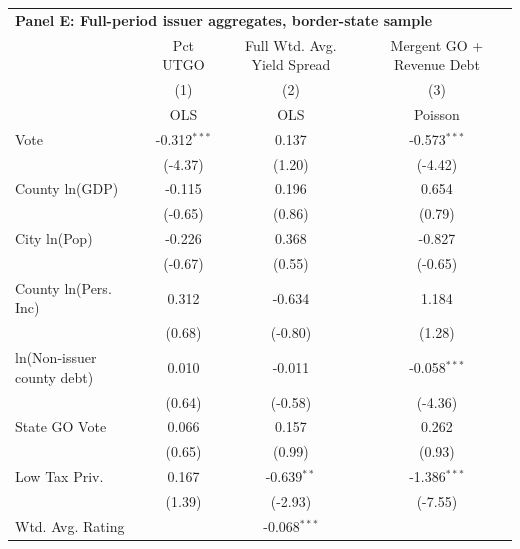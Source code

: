 \begingroup
\centering
\begin{tabular*}{\textwidth}{@{\extracolsep{\fill}}lccc}
\multicolumn{4}{l}{\textbf{Panel E: Full-period issuer aggregates, border-state sample}}\\

\addlinespace
   \toprule
                              & Pct UTGO       & Full Wtd. Avg. Yield Spread & Mergent GO + Revenue Debt\\  
                              & (1)            & (2)                         & (3)\\  
                              &  OLS           & OLS                         & Poisson\\  
   \midrule 
   Vote                       & -0.312$^{***}$ & 0.137                       & -0.573$^{***}$\\   
                              & (-4.37)       & (1.20)                     & (-4.42)\\   
   County ln(GDP)             & -0.115         & 0.196                       & 0.654\\   
                              & (-0.65)       & (0.86)                     & (0.79)\\   
   City ln(Pop)               & -0.226         & 0.368                       & -0.827\\   
                              & (-0.67)       & (0.55)                     & (-0.65)\\   
   County ln(Pers. Inc)       & 0.312          & -0.634                      & 1.184\\   
                              & (0.68)        & (-0.80)                    & (1.28)\\   
   ln(Non-issuer county debt) & 0.010          & -0.011                      & -0.058$^{***}$\\   
                              & (0.64)        & (-0.58)                    & (-4.36)\\   
   State GO Vote              & 0.066          & 0.157                       & 0.262\\   
                              & (0.65)        & (0.99)                     & (0.93)\\   
   Low Tax Priv.              & 0.167          & -0.639$^{**}$               & -1.386$^{***}$\\   
                              & (1.39)        & (-2.93)                    & (-7.55)\\   
   Wtd. Avg. Rating           &                & -0.068$^{***}$              &   \\   

\end{tabular*}
